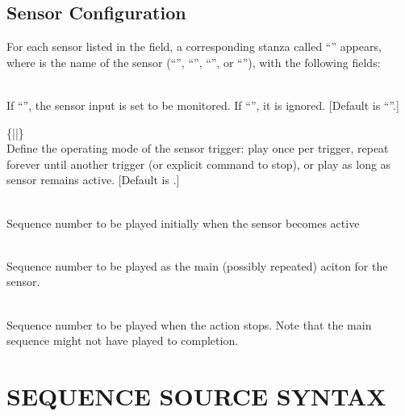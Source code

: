 \subsection*{Sensor Configuration}


For each sensor listed in the 
field, a corresponding stanza called 
``''
appears, where 
is the name of the sensor 
(``'',
``'',
``'',
or
``''),
with the following fields:
\begin{list}{}{}
\item[{\codetype{enabled=}\Var*{bool}}]\hfill\\
If 
``'',
the sensor input is set to be monitored.  If
``'',
it is ignored.  [Default is 
``''.]
\item[{\codetype{mode=}\{\codetype{once}|\codetype{repeat}|\codetype{while}\}}]\hfill\\
Define the operating mode of the sensor trigger: play once per trigger,
repeat forever until another trigger (or explicit command to stop), or
play as long as sensor remains active. [Default is 
.]
\item[{\codetype{setup=}\Var*{id}}]\hfill\\
Sequence
number to be played initially when the sensor becomes active
\item[{\codetype{sequence=}\Var*{id}}]\hfill\\
Sequence
number to be played as the main (possibly repeated) aciton for the sensor.
\item[{\codetype{terminate=}\Var*{id}}]\hfill\\
Sequence
number to be played when the action stops. Note that the
main sequence might not have played to completion.
\end{list}
\section*{SEQUENCE SOURCE SYNTAX}


